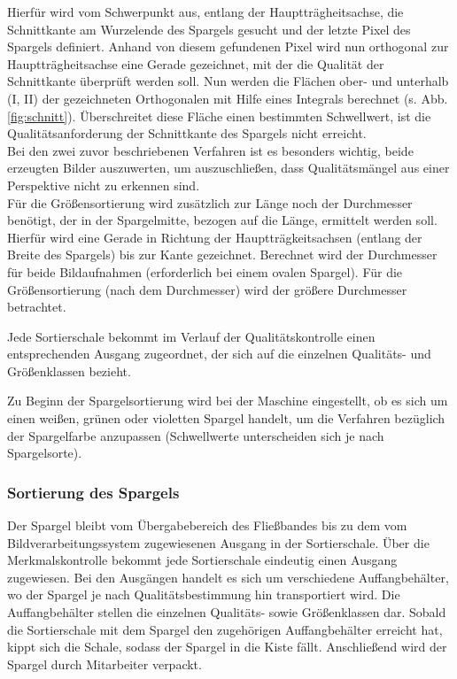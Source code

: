 \documentclass{ezb}
\begin{document}
Hierfür wird vom Schwerpunkt aus, entlang der Hauptträgheitsachse, die Schnittkante am Wurzelende des Spargels gesucht und der letzte Pixel des Spargels definiert.
Anhand von diesem gefundenen Pixel wird nun orthogonal zur Hauptträgheitsachse eine Gerade gezeichnet, mit der  die Qualität der Schnittkante überprüft werden soll.
Nun werden die Flächen ober- und unterhalb (I, II) der gezeichneten Orthogonalen mit Hilfe eines Integrals berechnet (s. Abb. \ref{fig:schnitt}).
Überschreitet diese Fläche einen bestimmten Schwellwert, ist die Qualitätsanforderung der Schnittkante des Spargels nicht erreicht.\\
\linebreak
Bei den zwei zuvor beschriebenen Verfahren ist es besonders wichtig, beide erzeugten Bilder auszuwerten, um auszuschließen, dass Qualitätsmängel aus einer Perspektive nicht zu erkennen sind.\\
\linebreak
Für die Größensortierung wird zusätzlich zur Länge noch der Durchmesser benötigt, der in der Spargelmitte, bezogen auf die Länge, ermittelt werden soll. Hierfür wird eine Gerade in Richtung der Hauptträgkeitsachsen (entlang der Breite des Spargels) bis zur Kante gezeichnet. Berechnet wird der Durchmesser für beide Bildaufnahmen (erforderlich bei einem ovalen Spargel). Für die Größensortierung (nach dem Durchmesser) wird der größere Durchmesser betrachtet.

Jede Sortierschale bekommt im Verlauf der Qualitätskontrolle einen entsprechenden Ausgang zugeordnet, der sich auf die einzelnen Qualitäts- und Größenklassen bezieht.

Zu Beginn der Spargelsortierung wird bei der Maschine eingestellt, ob es sich um einen weißen, grünen oder violetten Spargel handelt, um die Verfahren bezüglich der Spargelfarbe anzupassen (Schwellwerte unterscheiden sich je nach Spargelsorte).

\subsubsection*{Sortierung des Spargels}
Der Spargel bleibt vom Übergabebereich des Fließbandes bis zu dem vom Bildverarbeitungssystem zugewiesenen Ausgang in der Sortierschale. Über die Merkmalskontrolle bekommt jede Sortierschale eindeutig einen Ausgang zugewiesen. Bei den Ausgängen handelt es sich um verschiedene Auffangbehälter, wo der Spargel je nach Qualitätsbestimmung hin transportiert wird. Die Auffangbehälter stellen die einzelnen Qualitäts- sowie Größenklassen dar. 
Sobald die Sortierschale mit dem Spargel den zugehörigen Auffangbehälter erreicht
hat, kippt sich die Schale, sodass der Spargel in die Kiste fällt. 
Anschließend wird der Spargel durch Mitarbeiter verpackt.
\end{document}

